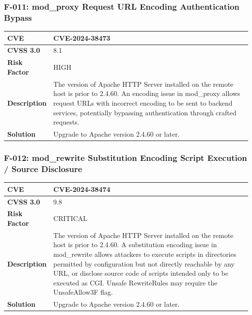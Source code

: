 \subsubsection{F-011: mod\_proxy Request URL Encoding Authentication Bypass}
\begin{tabular}{|p{2.8cm}|p{12.2cm}|}
\hline
\textbf{CVE} & CVE-2024-38473 \\ \hline
\textbf{CVSS 3.0} & 8.1 \\ \hline
\textbf{Risk Factor} & HIGH \\ \hline
\textbf{Description} & The version of Apache HTTP Server installed on the remote host is prior to 2.4.60. An encoding issue in mod\_proxy allows request URLs with incorrect encoding to be sent to backend services, potentially bypassing authentication through crafted requests. \\ \hline
\textbf{Solution} & Upgrade to Apache version 2.4.60 or later. \\ \hline
\end{tabular}

\subsubsection{F-012: mod\_rewrite Substitution Encoding Script Execution / Source Disclosure}
\begin{tabular}{|p{2.8cm}|p{12.2cm}|}
\hline
\textbf{CVE} & CVE-2024-38474 \\ \hline
\textbf{CVSS 3.0} & 9.8 \\ \hline
\textbf{Risk Factor} & CRITICAL \\ \hline
\textbf{Description} & The version of Apache HTTP Server installed on the remote host is prior to 2.4.60. A substitution encoding issue in mod\_rewrite allows attackers to execute scripts in directories permitted by configuration but not directly reachable by any URL, or disclose source code of scripts intended only to be executed as CGI. Unsafe RewriteRules may require the UnsafeAllow3F flag. \\ \hline
\textbf{Solution} & Upgrade to Apache version 2.4.60 or later. \\ \hline
\end{tabular}

